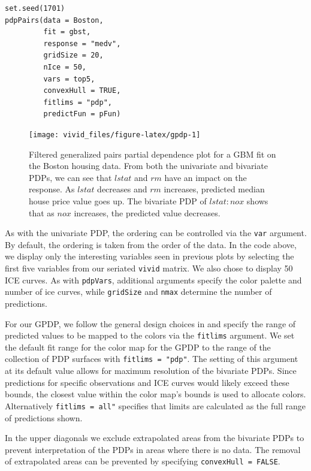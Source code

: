 \begin{verbatim}
set.seed(1701)
pdpPairs(data = Boston,
         fit = gbst,
         response = "medv",
         gridSize = 20,
         nIce = 50,
         vars = top5,
         convexHull = TRUE,
         fitlims = "pdp",
         predictFun = pFun)
\end{verbatim}

\begin{figure}

{\centering \texttt{[image: vivid\_files/figure-latex/gpdp-1]} 

}

\caption{Filtered generalized pairs partial dependence plot for a GBM fit on the Boston housing data. From both the univariate and bivariate PDPs, we can see that $lstat$ and $rm$ have an impact on the response. As $lstat$ decreases and $rm$ increases, predicted median house price value goes up. The bivariate PDP of $lstat:nox$ shows that as $nox$ increases, the predicted value decreases.}\label{fig:gpdp}
\end{figure}

As with the univariate PDP, the ordering can be controlled via the \texttt{var} argument. By default, the ordering is taken from the order of the data. In the code above, we display only the interesting variables seen in previous plots by selecting the first five variables from our seriated \texttt{vivid} matrix. We also chose to display 50 ICE curves. As with \texttt{pdpVars}, additional arguments specify the color palette and number of ice curves, while \texttt{gridSize} and \texttt{nmax} determine the number of predictions.

For our GPDP, we follow the general design choices in  and specify the range of predicted values to be mapped to the colors via the \texttt{fitlims} argument. We set the default fit range for the color map for the GPDP to the range of the collection of PDP surfaces with \texttt{fitlims\ =\ "pdp"}. The setting of this argument at its default value allows for maximum resolution of the bivariate PDPs. Since predictions for specific observations and ICE curves would likely exceed these bounds, the closest value within the color map's bounds is used to allocate colors. Alternatively \texttt{fitlims\ =\ \textquotesingle{}all"} specifies that limits are calculated as the full range of predictions shown.

In the upper diagonals we exclude extrapolated areas from the bivariate PDPs to prevent interpretation of the PDPs in areas where there is no data. The removal of extrapolated areas can be prevented by specifying \texttt{convexHull\ =\ FALSE}.

